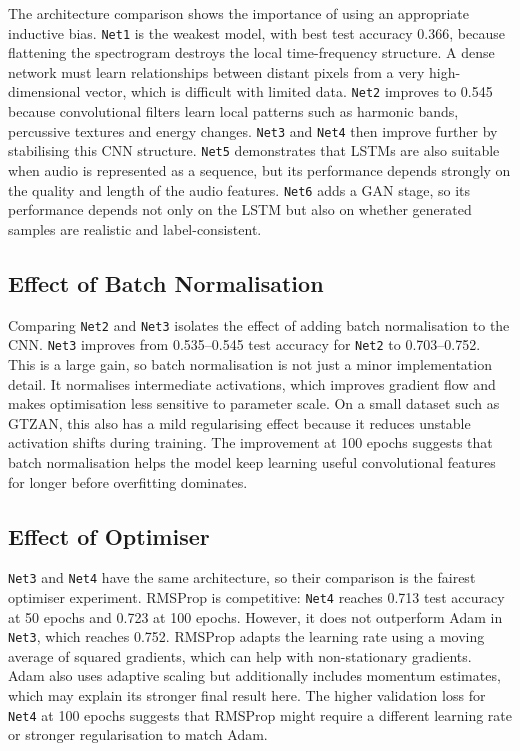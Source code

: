 \documentclass[10pt,twocolumn,letterpaper]{article}
\begin{document}
The architecture comparison shows the importance of using an appropriate inductive bias. \texttt{Net1} is the weakest model, with best test accuracy 0.366, because flattening the spectrogram destroys the local time-frequency structure. A dense network must learn relationships between distant pixels from a very high-dimensional vector, which is difficult with limited data. \texttt{Net2} improves to 0.545 because convolutional filters learn local patterns such as harmonic bands, percussive textures and energy changes. \texttt{Net3} and \texttt{Net4} then improve further by stabilising this CNN structure. \texttt{Net5} demonstrates that LSTMs are also suitable when audio is represented as a sequence, but its performance depends strongly on the quality and length of the audio features. \texttt{Net6} adds a GAN stage, so its performance depends not only on the LSTM but also on whether generated samples are realistic and label-consistent.

\subsection{Effect of Batch Normalisation}

Comparing \texttt{Net2} and \texttt{Net3} isolates the effect of adding batch normalisation to the CNN. \texttt{Net3} improves from 0.535--0.545 test accuracy for \texttt{Net2} to 0.703--0.752. This is a large gain, so batch normalisation is not just a minor implementation detail. It normalises intermediate activations, which improves gradient flow and makes optimisation less sensitive to parameter scale. On a small dataset such as GTZAN, this also has a mild regularising effect because it reduces unstable activation shifts during training. The improvement at 100 epochs suggests that batch normalisation helps the model keep learning useful convolutional features for longer before overfitting dominates.

\subsection{Effect of Optimiser}

\texttt{Net3} and \texttt{Net4} have the same architecture, so their comparison is the fairest optimiser experiment. RMSProp is competitive: \texttt{Net4} reaches 0.713 test accuracy at 50 epochs and 0.723 at 100 epochs. However, it does not outperform Adam in \texttt{Net3}, which reaches 0.752. RMSProp adapts the learning rate using a moving average of squared gradients, which can help with non-stationary gradients. Adam also uses adaptive scaling but additionally includes momentum estimates, which may explain its stronger final result here. The higher validation loss for \texttt{Net4} at 100 epochs suggests that RMSProp might require a different learning rate or stronger regularisation to match Adam.
\end{document}
